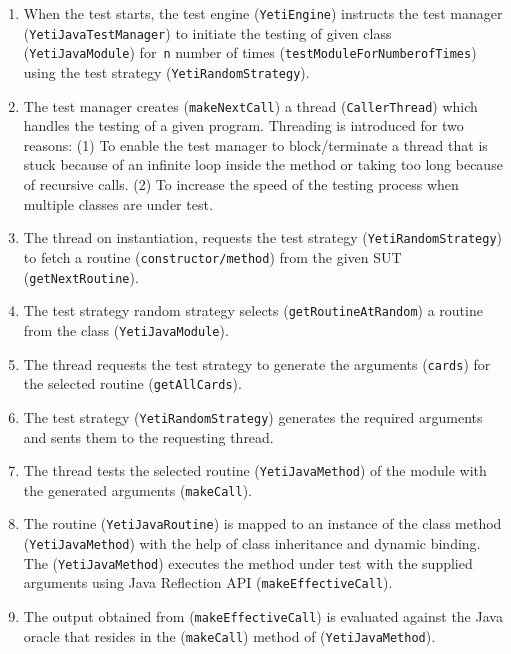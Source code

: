 \begin{enumerate}
\item When the test starts, the test engine (\verb+YetiEngine+) instructs the test manager (\verb+YetiJavaTestManager+) to initiate the testing of given class (\verb+YetiJavaModule+) for~\verb+n+ number of times (\verb+testModuleForNumberofTimes+) using the test strategy (\verb+YetiRandomStrategy+).

\item The test manager creates (\verb+makeNextCall+) a thread (\verb+CallerThread+) which handles the testing of a given program. Threading is introduced for two reasons: (1) To enable the test manager to block/terminate a thread that is stuck because of an infinite loop inside the method or taking too long because of recursive calls. (2) To increase the speed of the testing process when multiple classes are under test.

\item The thread on instantiation, requests the test strategy (\verb+YetiRandomStrategy+) to fetch a routine (\verb+constructor/method+) from the given SUT (\verb+getNextRoutine+).

\item The test strategy random strategy selects (\verb+getRoutineAtRandom+) a routine from the class (\verb+YetiJavaModule+).

\item The thread requests the test strategy to generate the arguments (\verb+cards+) for the selected routine (\verb+getAllCards+).

 \item The test strategy (\verb+YetiRandomStrategy+) generates the required arguments and sents them to the requesting thread.
 
 \item The thread tests the selected routine (\verb+YetiJavaMethod+) of the module with the generated arguments (\verb+makeCall+).
 
 \item The routine (\verb+YetiJavaRoutine+) is mapped to an instance of the class method (\verb+YetiJavaMethod+) with the help of class inheritance and dynamic binding. The (\verb+YetiJavaMethod+) executes the method under test with the supplied arguments using Java Reflection API (\verb+makeEffectiveCall+).
 
\item The output obtained from (\verb+makeEffectiveCall+) is evaluated against the Java oracle that resides in the (\verb+makeCall+) method of (\verb+YetiJavaMethod+).

\end{enumerate}



